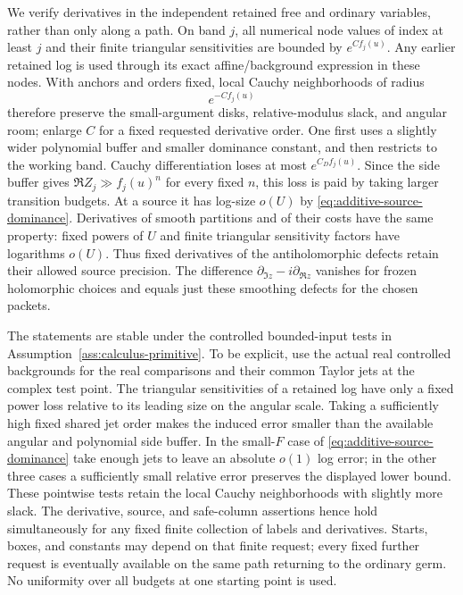 We verify derivatives in the independent retained free and ordinary
variables, rather than only along a path.  On band $j$, all numerical
node values of index at least $j$ and their finite triangular
sensitivities are bounded by $e^{C f_j(u)}$.  Any earlier retained log
is used through its exact affine/background expression in these
nodes.  With anchors and orders fixed, local Cauchy neighborhoods of
radius
\begin{equation}\label{eq:additive-Cauchy-radius}
 e^{-C f_j(u)}
\end{equation}
therefore preserve the small-argument disks, relative-modulus slack,
and angular room; enlarge $C$ for a fixed requested derivative order.
One first uses a slightly wider polynomial buffer and smaller
dominance constant, and then restricts to the working band.  Cauchy
differentiation loses at most $e^{C_Df_j(u)}$.  Since the side buffer
gives $\Re Z_j\gg f_j(u)^n$ for every fixed $n$, this loss is paid
by taking larger transition budgets.  At a source it has log-size
$o(U)$ by \eqref{eq:additive-source-dominance}.  Derivatives of smooth
partitions and of their costs have the same property: fixed powers of
$U$ and finite triangular sensitivity factors have logarithms $o(U)$.
Thus fixed derivatives of the antiholomorphic defects retain their
allowed source precision.  The difference
$\partial_{\Im z}-i\partial_{\Re z}$ vanishes for frozen holomorphic
choices and equals just these smoothing defects for the chosen packets.

The statements are stable under the controlled bounded-input tests
in Assumption~\ref{ass:calculus-primitive}.  To be explicit, use the
actual real controlled backgrounds for the real comparisons and their
common Taylor jets at the complex test point.  The triangular
sensitivities of a retained log have only a fixed power loss relative
to its leading size on the angular scale.  Taking a sufficiently high
fixed shared jet order makes the induced error smaller than the
available angular and polynomial side buffer.  In the small-$F$ case
of \eqref{eq:additive-source-dominance} take enough jets to leave an
absolute $o(1)$ log error; in the other three cases a sufficiently
small relative error preserves the displayed lower bound.  These
pointwise tests retain the local Cauchy neighborhoods with slightly
more slack.  The derivative, source, and safe-column assertions hence
hold simultaneously for any fixed finite collection of labels and
derivatives.  Starts, boxes, and constants may depend on that finite
request; every fixed further request is eventually available on the
same path returning to the ordinary germ.  No uniformity over all
budgets at one starting point is used.

